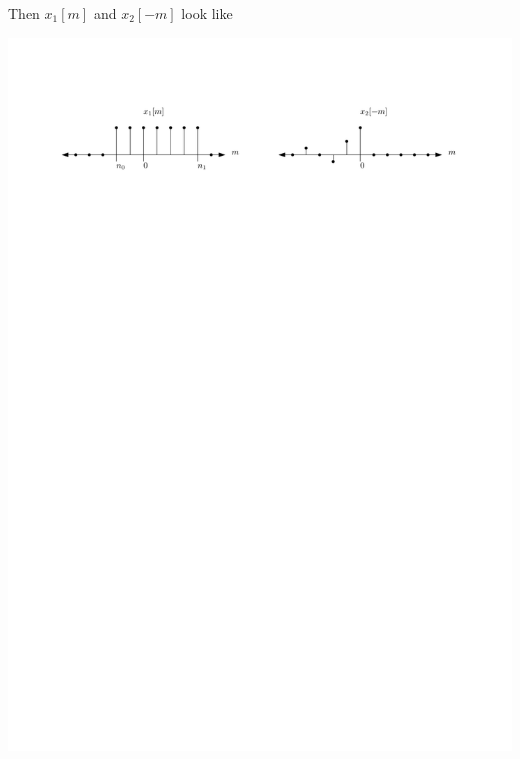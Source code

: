 Then $x_1[m]$ and $x_2[-m]$ look like
\begin{center}
  \includegraphics[scale=1]{graphics/dtconvolution-explain2.pdf}
\end{center}

